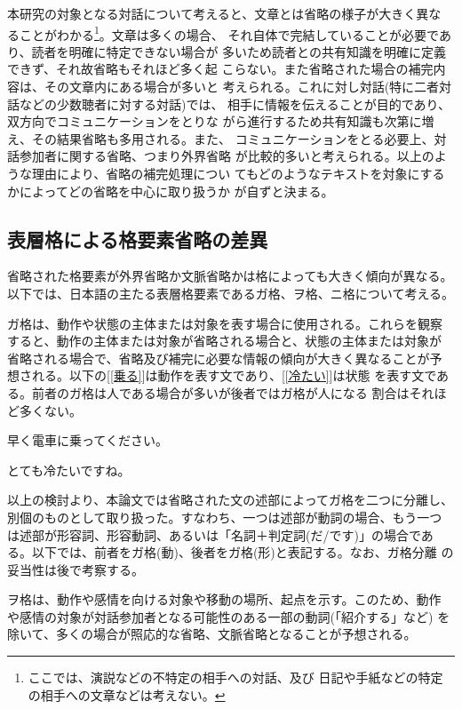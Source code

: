 本研究の対象となる対話について考えると、文章とは省略の様子が大きく異な
ることがわかる\footnote{ここでは、演説などの不特定の相手への対話、及び
日記や手紙などの特定の相手への文章などは考えない。}。文章は多くの場合、
それ自体で完結していることが必要であり、読者を明確に特定できない場合が
多いため読者との共有知識を明確に定義できず、それ故省略もそれほど多く起
こらない。また省略された場合の補完内容は、その文章内にある場合が多いと
考えられる。これに対し対話(特に二者対話などの少数聴者に対する対話)では、
相手に情報を伝えることが目的であり、双方向でコミュニケーションをとりな
がら進行するため共有知識も次第に増え、その結果省略も多用される。また、
コミュニケーションをとる必要上、対話参加者に関する省略、つまり外界省略
が比較的多いと考えられる。以上のような理由により、省略の補完処理につい
てもどのようなテキストを対象にするかによってどの省略を中心に取り扱うか
が自ずと決まる。


\subsection{表層格による格要素省略の差異}

省略された格要素が外界省略か文脈省略かは格によっても大きく傾向が異なる。
以下では、日本語の主たる表層格要素であるガ格、ヲ格、ニ格について考える。

ガ格は、動作や状態の主体または対象を表す場合に使用される。これらを観察
すると、動作の主体または対象が省略される場合と、状態の主体または対象が
省略される場合で、省略及び補完に必要な情報の傾向が大きく異なることが予
想される。以下の[\ref{乗る}]は動作を表す文であり、[\ref{冷たい}]は状態
を表す文である。前者のガ格は人である場合が多いが後者ではガ格が人になる
割合はそれほど多くない。

\begin{example}
\item 早く電車に乗ってください。\label{乗る}
\item とても冷たいですね。\label{冷たい}
\end{example}

以上の検討より、本論文では省略された文の述部によってガ格を二つに分離し、
別個のものとして取り扱った。すなわち、一つは述部が動詞の場合、もう一つ
は述部が形容詞、形容動詞、あるいは「名詞＋判定詞(だ/です)」の場合であ
る。以下では、前者をガ格(動)、後者をガ格(形)と表記する。なお、ガ格分離
の妥当性は後で考察する。

ヲ格は、動作や感情を向ける対象や移動の場所、起点を示す。このため、動作
や感情の対象が対話参加者となる可能性のある一部の動詞(「紹介する」など)
を除いて、多くの場合が照応的な省略、文脈省略となることが予想される。

